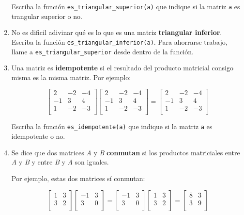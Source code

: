 \begin{enumerate}
  Escriba la función \lstinline!es_triangular_superior(a)! que indique
  si la matriz \lstinline!a! es trangular superior o no.
\item
  No es dificil adivinar qué es lo que es una matriz \textbf{triangular
  inferior}. Escriba la función \lstinline!es_triangular_inferior(a)!.
  Para ahorrarse trabajo, llame a \lstinline!es_triangular_superior!
  desde dentro de la función.
\item
  Una matriz es \textbf{idempotente} si el resultado del producto
  matricial consigo misma es la misma matriz. Por ejemplo:

  \[\begin{bmatrix}
  2 & -2 & -4 \\
  -1 &  3 &  4 \\
  1 & -2 & -3 \\
  \end{bmatrix}
  \begin{bmatrix}
  2 & -2 & -4 \\
  -1 &  3 &  4 \\
  1 & -2 & -3 \\
  \end{bmatrix}
  =
  \begin{bmatrix}
  2 & -2 & -4 \\
  -1 &  3 &  4 \\
  1 & -2 & -3 \\
  \end{bmatrix}\]

  Escriba la función \lstinline!es_idempotente(a)! que indique si la
  matriz \lstinline!a! es idempotente o no.
\item
  Se dice que dos matrices \emph{A} y \emph{B} \textbf{conmutan} si los
  productos matriciales entre \emph{A} y \emph{B} y entre \emph{B} y
  \emph{A} son iguales.

  Por ejemplo, estas dos matrices sí conmutan:

  \[\begin{bmatrix}
  1 & 3 \\ 3 & 2 \\
  \end{bmatrix}
  \begin{bmatrix}
  -1 & 3 \\ 3 & 0 \\
  \end{bmatrix} =
  \begin{bmatrix}
  -1 & 3 \\ 3 & 0 \\
  \end{bmatrix}
  \begin{bmatrix}
  1 & 3 \\ 3 & 2 \\
  \end{bmatrix} =
  \begin{bmatrix}
  8 & 3 \\ 3 & 9 \\
  \end{bmatrix}\]


\end{enumerate}

